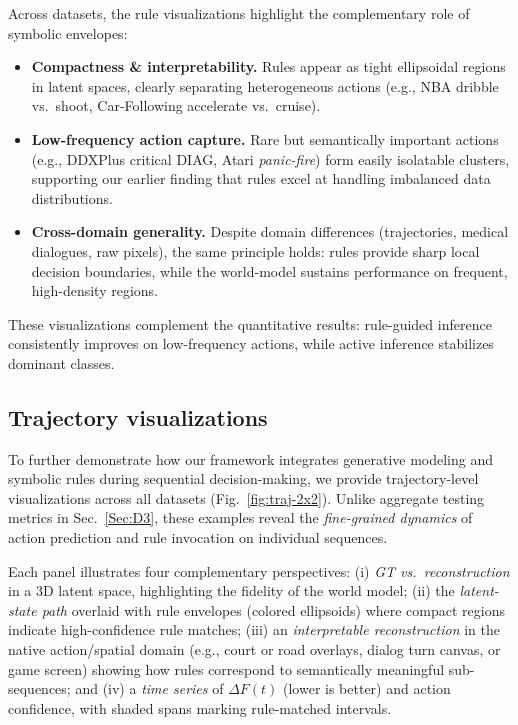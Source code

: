 \documentclass{article} %
\begin{document}
Across datasets, the rule visualizations highlight the complementary role of symbolic envelopes:  
\begin{itemize}
  \item \textbf{Compactness \& interpretability.} Rules appear as tight ellipsoidal regions in latent spaces, 
  clearly separating heterogeneous actions (e.g., NBA dribble vs.~shoot, Car-Following accelerate vs.~cruise).  
  \item \textbf{Low-frequency action capture.} Rare but semantically important actions 
  (e.g., DDXPlus critical DIAG, Atari \emph{panic-fire}) form easily isolatable clusters, 
  supporting our earlier finding that rules excel at handling imbalanced data distributions.  
  \item \textbf{Cross-domain generality.} Despite domain differences (trajectories, medical dialogues, raw pixels), 
  the same principle holds: rules provide sharp local decision boundaries, while the world-model 
  sustains performance on frequent, high-density regions.  
\end{itemize}

These visualizations complement the quantitative results: rule-guided inference consistently improves 
on low-frequency actions, while active inference stabilizes dominant classes.


\subsection{Trajectory visualizations}
\label{sec:C4}

To further demonstrate how our framework integrates generative modeling and symbolic
rules during sequential decision-making, we provide trajectory-level visualizations
across all datasets (Fig.~\ref{fig:traj-2x2}). Unlike aggregate testing metrics in
Sec.~\ref{Sec:D3}, these examples reveal the \emph{fine-grained dynamics} of action
prediction and rule invocation on individual sequences.

Each panel illustrates four complementary perspectives:
(i) \emph{GT vs.\ reconstruction} in a 3D latent space, highlighting the fidelity of
the world model; (ii) the \emph{latent-state path} overlaid with rule envelopes
(colored ellipsoids) where compact regions indicate high-confidence rule matches;
(iii) an \emph{interpretable reconstruction} in the native action/spatial domain
(e.g., court or road overlays, dialog turn canvas, or game screen) showing how
rules correspond to semantically meaningful sub-sequences; and
(iv) a \emph{time series} of $\Delta F(t)$ (lower is better) and action confidence,
with shaded spans marking rule-matched intervals.
\end{document}
